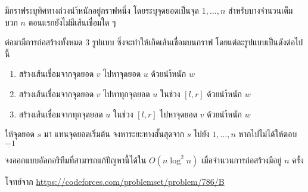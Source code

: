 มีกราฟระบุทิศทางถ่วงนำ้หนักอยู่กราฟหนึ่ง โดยระบุจุดยอดเป็นจุด $1, \dots, n$ สำหรับบางจำนวนเต็มบวก $n$ ตอนแรกยังไม่มีเส้นเชื่อมใด ๆ

ต่อมามีการก่อสร้างทั้งหมด 3 รูปแบบ ซึ่งจะทำให้เกิดเส้นเชื่อมบนกราฟ โดยแต่ละรูปแบบเป็นดังต่อไปนี้

\begin{enumerate}
    \item สร้างเส้นเชื่อมจากจุดยอด $v$ ไปหาจุดยอด $u$ ด้วยนำ้หนัก $w$
    \item สร้างเส้นเชื่อมจากจุดยอด $v$ ไปหาทุกจุดยอด $u$ ในช่วง $[l, r]$ ด้วยนำ้หนัก $w$
    \item สร้างเส้นเชื่อมจากทุกจุดยอด $u$ ในช่วง $[l, r]$ ไปหาจุดยอด $v$ ด้วยนำ้หนัก $w$
\end{enumerate}

ให้จุดยอด $s$ มา แทนจุดยอดเริ่มต้น จงหาระยะทางสั้นสุดจาก $s$ ไปยัง $1, \dots, n$ หากไปไม่ได้ให้ตอบ $-1$

\begin{exercise}
จงออกแบบอัลกอริทึมที่สามารถแก้ปัญหานี้ได้ใน $O(n \log^2 n)$ เมื่อจำนวนการก่อสร้างมีอยู่ $n$ ครั้ง
\end{exercise}

โจทย์จาก \url{https://codeforces.com/problemset/problem/786/B}
